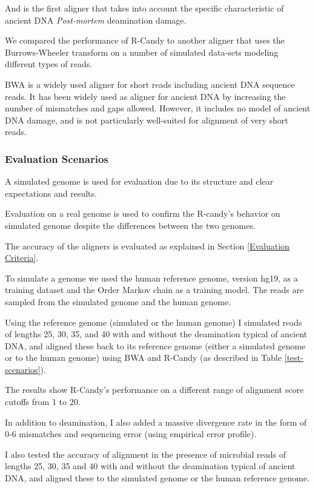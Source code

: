\documentclass[11pt,a4paper]{report}
\begin{document}
And is the first aligner that takes into account the specific characteristic
of ancient DNA \emph{Post-mortem} deamination damage.

We compared the performance of R-Candy to another aligner that 
uses the Burrows-Wheeler transform\cite{bwa} on a number of simulated 
data-sets modeling different types of reads. 

BWA is a widely used aligner for short reads including ancient
DNA sequence reads.
It has been widely used as aligner for ancient DNA by increasing 
the number of mismatches and gaps allowed.  
However, it includes no model of ancient DNA damage, and is not 
particularly well-suited for alignment of very short reads.




\subsubsection{Evaluation Scenarios} \label{Evaluation Scenarios}

A simulated genome is used for evaluation due to its structure and
clear expectations and results. 

Evaluation on a real genome is used to 
confirm the R-candy's behavior on simulated genome despite the 
differences between the two genomes.

The accuracy of the aligners is evaluated as explained in Section
 \ref{Evaluation Criteria}.

To simulate a genome we used the human reference genome, version hg19,
as a training dataset and the  Order Markov chain as a training 
model. The reads are sampled from the simulated genome and the human genome. 

Using the reference genome (simulated or the human genome) I simulated 
reads of lengths 25, 30, 35, and 40 with and without the deamination 
typical of ancient DNA, and aligned these back to its reference genome
(either a simulated genome or to the human genome) using BWA and R-Candy (as 
described in Table \ref{test-scenarios}).

The results show R-Candy's performance on a different range of alignment
score cutoffs from 1 to 20.

In addition to deamination, I also added a massive divergence rate in
the form of 0-6 mismatches and sequencing error (using empirical error profile).  

I also tested the accuracy of alignment in the presence of microbial reads of 
lengths 25, 30, 35 and 40 with and without the deamination typical of ancient DNA, 
and aligned these to the simulated genome or the human reference genome.
\end{document}
